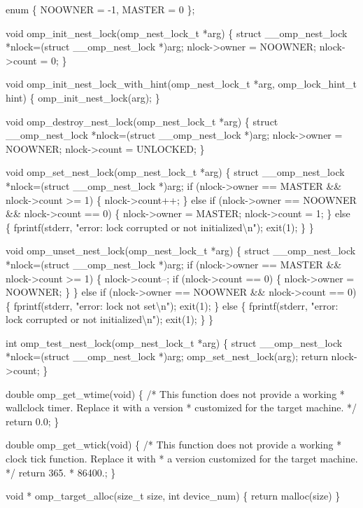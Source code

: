{\begin{codepar}
enum \{ NOOWNER = -1, MASTER = 0 \};

void omp\_init\_nest\_lock(omp\_nest\_lock\_t *arg)
\{
    struct \_\_omp\_nest\_lock *nlock=(struct \_\_omp\_nest\_lock *)arg;
    nlock->owner = NOOWNER;
    nlock->count = 0;
\}

void omp\_init\_nest\_lock\_with\_hint(omp\_nest\_lock\_t *arg, 
                                  omp\_lock\_hint\_t hint)
\{
    omp\_init\_nest\_lock(arg);
\}

void omp\_destroy\_nest\_lock(omp\_nest\_lock\_t *arg)
\{
    struct \_\_omp\_nest\_lock *nlock=(struct \_\_omp\_nest\_lock *)arg;
    nlock->owner = NOOWNER;
    nlock->count = UNLOCKED;
\}

void omp\_set\_nest\_lock(omp\_nest\_lock\_t *arg)
\{
    struct \_\_omp\_nest\_lock *nlock=(struct \_\_omp\_nest\_lock *)arg;
    if (nlock->owner == MASTER \&\& nlock->count >= 1)
    \{
        nlock->count++;
    \}
    else if (nlock->owner == NOOWNER \&\& nlock->count == 0)
    \{
        nlock->owner = MASTER;
        nlock->count = 1;
    \}
    else
    \{
        fprintf(stderr, "error: lock corrupted or not initialized{\textbackslash}n");
        exit(1);
    \}
\}

void omp\_unset\_nest\_lock(omp\_nest\_lock\_t *arg)
\{
    struct \_\_omp\_nest\_lock *nlock=(struct \_\_omp\_nest\_lock *)arg;
    if (nlock->owner == MASTER \&\& nlock->count >= 1)
    \{
        nlock->count--;
        if (nlock->count == 0)
        \{
            nlock->owner = NOOWNER;
        \}
    \}
    else if (nlock->owner == NOOWNER \&\& nlock->count == 0)
    \{
        fprintf(stderr, "error: lock not set{\textbackslash}n");
        exit(1);
    \}
    else
    \{
        fprintf(stderr, "error: lock corrupted or not initialized{\textbackslash}n");
        exit(1);
    \}
\}

int omp\_test\_nest\_lock(omp\_nest\_lock\_t *arg)
\{
    struct \_\_omp\_nest\_lock *nlock=(struct \_\_omp\_nest\_lock *)arg;
    omp\_set\_nest\_lock(arg);
    return nlock->count;
\}

double omp\_get\_wtime(void)
\{
/* This function does not provide a working
 * wallclock timer. Replace it with a version
 * customized for the target machine.
 */
    return 0.0;
\}

double omp\_get\_wtick(void)
\{
/* This function does not provide a working
 * clock tick function. Replace it with
 * a version customized for the target machine.
 */
    return 365. * 86400.;
\}

void * omp\_target\_alloc(size\_t size, int device\_num)
\{
    return malloc(size)
\}


\end{codepar}}
